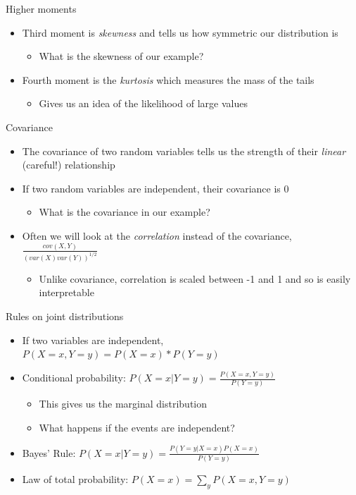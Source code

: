 \documentclass[aspectratio=169]{beamer}
\begin{document}
\begin{frame}{Higher moments}
    \begin{itemize}
        \item Third moment is \textit{skewness} and tells us how symmetric our distribution is
        \begin{itemize}
            \item What is the skewness of our example?
        \end{itemize}
        \item Fourth moment is the \textit{kurtosis} which measures the mass of the tails
        \begin{itemize}
            \item Gives us an idea of the likelihood of large values
        \end{itemize}
    \end{itemize}
\end{frame}

\begin{frame}{Covariance}
    \begin{itemize}
        \item The covariance of two random variables tells us the strength of their \textit{linear} (careful!) relationship
        \item If two random variables are independent, their covariance is 0
        \begin{itemize}
            \item What is the covariance in our example?
        \end{itemize}
        \item Often we will look at the \textit{correlation} instead of the covariance, $\frac{cov(X,Y)}{(var(X)var(Y))^{1/2}}$
        \begin{itemize}
            \item Unlike covariance, correlation is scaled between -1 and 1 and so is easily interpretable
        \end{itemize}
    \end{itemize}
\end{frame}

\begin{frame}{Rules on joint distributions}
    \begin{itemize}
        \item If two variables are independent, $P(X=x,Y=y) = P(X=x)*P(Y=y)$
        \item Conditional probability: $P(X=x|Y=y) = \frac{P(X=x,Y=y)}{P(Y=y)}$
        \begin{itemize}
            \item This gives us the marginal distribution
            \item What happens if the events are independent?
        \end{itemize}
        \item Bayes' Rule: $P(X=x|Y=y) = \frac{P(Y=y|X=x)P(X=x)}{P(Y=y)}$
        \item Law of total probability: $P(X=x) = \sum_y P(X=x,Y=y)$
    \end{itemize}
\end{frame}
\end{document}
